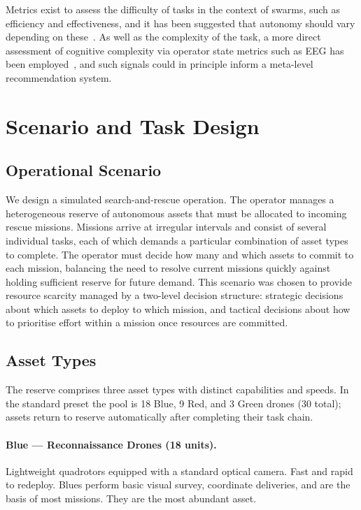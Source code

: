 \documentclass[10pt]{article}
\theoremstyle{definition}
\begin{document}
Metrics exist to assess the difficulty of tasks in the context of swarms, such as efficiency and effectiveness, and it has been suggested that autonomy should vary depending on these~\cite{hussein_characterization_2022}. As well as the complexity of the task, a more direct assessment of cognitive complexity via operator state metrics such as EEG has been employed~\cite{abbass_augmented_2014}, and such signals could in principle inform a meta-level recommendation system.


\section{Scenario and Task Design}\label{sec:task}

\subsection{Operational Scenario}

We design a simulated search-and-rescue operation. The operator manages a heterogeneous reserve of autonomous assets that must be allocated to incoming rescue missions. Missions arrive at irregular intervals and consist of several individual tasks, each of which demands a particular combination of asset types to complete. The operator must decide how many and which assets to commit to each mission, balancing the need to resolve current missions quickly against holding sufficient reserve for future demand. This scenario was chosen to provide resource scarcity managed by a two-level decision structure: strategic decisions about which assets to deploy to which mission, and tactical decisions about how to prioritise effort within a mission once resources are committed.

\subsection{Asset Types}\label{sec:assets}

The reserve comprises three asset types with distinct capabilities and speeds. In the standard preset the pool is 18 Blue, 9 Red, and 3 Green drones (30 total); assets return to reserve automatically after completing their task chain.

\paragraph{Blue --- Reconnaissance Drones (18 units).}
Lightweight quadrotors equipped with a standard optical camera. Fast and rapid to redeploy. Blues perform basic visual survey, coordinate deliveries, and are the basis of most missions. They are the most abundant asset.
\end{document}
